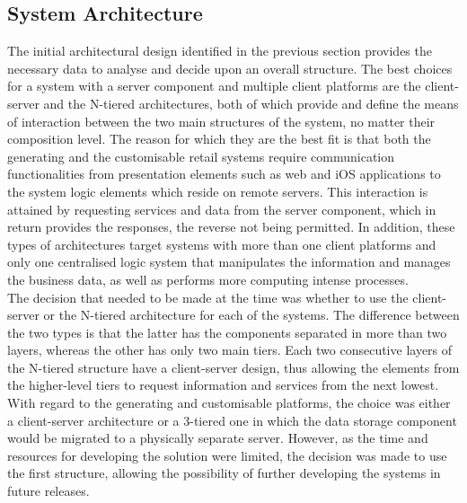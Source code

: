 \subsection{System Architecture}

The initial architectural design identified in the previous section provides the necessary data to analyse and decide upon an overall structure. The best choices for a system with a server component and multiple client platforms are the client-server and the N-tiered architectures, both of which provide and define the means of interaction between the two main structures of the system, no matter their composition level. The reason for which they are the best fit is that both the generating and the customisable retail systems require communication functionalities from presentation elements such as web and iOS applications to the system logic elements which reside on remote servers. This interaction is attained by requesting services and data from the server component, which in return provides the responses, the reverse not being permitted. In addition, these types of architectures target systems with more than one client platforms and only one centralised logic system that manipulates the information and manages the business data, as well as performs more computing intense processes.\\

The decision that needed to be made at the time was whether to use the client-server or the N-tiered architecture for each of the systems. The difference between the two types is that the latter has the components separated in more than two layers, whereas the other has only two main tiers. Each two consecutive layers of the N-tiered structure have a client-server design, thus allowing the elements from the higher-level tiers to request information and services from the next lowest. With regard to the generating and customisable platforms, the choice was either a client-server architecture or a 3-tiered one in which the data storage component would be migrated to a physically separate server. However, as the time and resources for developing the solution were limited, the decision was made to use the first structure, allowing the possibility of further developing the systems in future releases.\\